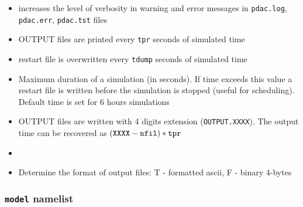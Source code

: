 \begin{itemize}
\item
{}
{increases the level of verbosity in warning and error messages 
in {\tt pdac.log}, {\tt pdac.err}, {\tt pdac.tst} files}

\item
{}
{OUTPUT files are printed every {\tt tpr} seconds of simulated time}

\item
{}
{restart file is overwritten every {\tt tdump} seconds of simulated time}

\item
{}
{Maximum duration of a simulation (in seconds). If time exceeds this value
a restart file is written before the simulation is stopped (useful for
scheduling). Default time is set for 6 hours simulations}

\item
{}
{OUTPUT files are written with 4 digits extension ({\tt OUTPUT.XXXX}). 
The output time can be recovered as $({\tt XXXX - nfil})* {\tt tpr}$ }

\item
{}
{}

\item
{}
{Determine the format of output files: T - formatted ascii, 
F - binary 4-bytes }

\end{itemize}

\subsubsection{ {\tt model} namelist}


